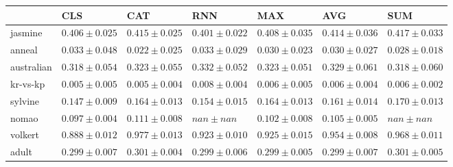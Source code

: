 \begin{tabular}{lllllll}
\toprule
 & CLS & CAT & RNN & MAX & AVG & SUM \\
\midrule
jasmine & $0.406 \pm 0.025$ & $0.415 \pm 0.025$ & $0.401 \pm 0.022$ & $0.408 \pm 0.035$ & $0.414 \pm 0.036$ & $0.417 \pm 0.033$ \\
anneal & $0.033 \pm 0.048$ & $0.022 \pm 0.025$ & $0.033 \pm 0.029$ & $0.030 \pm 0.023$ & $0.030 \pm 0.027$ & $0.028 \pm 0.018$ \\
australian & $0.318 \pm 0.054$ & $0.323 \pm 0.055$ & $0.332 \pm 0.052$ & $0.323 \pm 0.051$ & $0.329 \pm 0.061$ & $0.318 \pm 0.060$ \\
kr-vs-kp & $0.005 \pm 0.005$ & $0.005 \pm 0.004$ & $0.008 \pm 0.004$ & $0.006 \pm 0.005$ & $0.006 \pm 0.004$ & $0.006 \pm 0.002$ \\
sylvine & $0.147 \pm 0.009$ & $0.164 \pm 0.013$ & $0.154 \pm 0.015$ & $0.164 \pm 0.013$ & $0.161 \pm 0.014$ & $0.170 \pm 0.013$ \\
nomao & $0.097 \pm 0.004$ & $0.111 \pm 0.008$ & $nan \pm nan$ & $0.102 \pm 0.008$ & $0.105 \pm 0.005$ & $nan \pm nan$ \\
volkert & $0.888 \pm 0.012$ & $0.977 \pm 0.013$ & $0.923 \pm 0.010$ & $0.925 \pm 0.015$ & $0.954 \pm 0.008$ & $0.968 \pm 0.011$ \\
adult & $0.299 \pm 0.007$ & $0.301 \pm 0.004$ & $0.299 \pm 0.006$ & $0.299 \pm 0.005$ & $0.299 \pm 0.007$ & $0.301 \pm 0.005$ \\
\bottomrule
\end{tabular}
